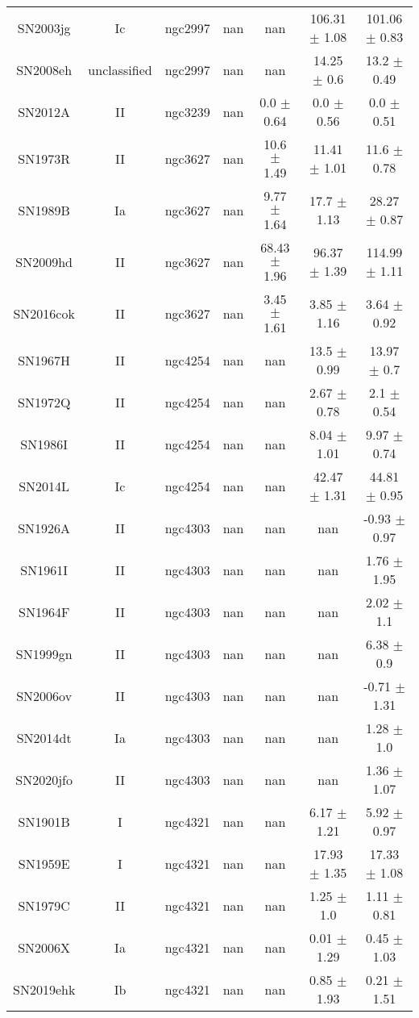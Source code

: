 \begin{table}
\begin{tabular}{ccccccc}
SN2003jg & Ic & ngc2997 & nan & nan & 106.31 $\pm$ 1.08 & 101.06 $\pm$ 0.83 \\
SN2008eh & unclassified & ngc2997 & nan & nan & 14.25 $\pm$ 0.6 & 13.2 $\pm$ 0.49 \\
SN2012A & II & ngc3239 & nan & 0.0 $\pm$ 0.64 & 0.0 $\pm$ 0.56 & 0.0 $\pm$ 0.51 \\
SN1973R & II & ngc3627 & nan & 10.6 $\pm$ 1.49 & 11.41 $\pm$ 1.01 & 11.6 $\pm$ 0.78 \\
SN1989B & Ia & ngc3627 & nan & 9.77 $\pm$ 1.64 & 17.7 $\pm$ 1.13 & 28.27 $\pm$ 0.87 \\
SN2009hd & II & ngc3627 & nan & 68.43 $\pm$ 1.96 & 96.37 $\pm$ 1.39 & 114.99 $\pm$ 1.11 \\
SN2016cok & II & ngc3627 & nan & 3.45 $\pm$ 1.61 & 3.85 $\pm$ 1.16 & 3.64 $\pm$ 0.92 \\
SN1967H & II & ngc4254 & nan & nan & 13.5 $\pm$ 0.99 & 13.97 $\pm$ 0.7 \\
SN1972Q & II & ngc4254 & nan & nan & 2.67 $\pm$ 0.78 & 2.1 $\pm$ 0.54 \\
SN1986I & II & ngc4254 & nan & nan & 8.04 $\pm$ 1.01 & 9.97 $\pm$ 0.74 \\
SN2014L & Ic & ngc4254 & nan & nan & 42.47 $\pm$ 1.31 & 44.81 $\pm$ 0.95 \\
SN1926A & II & ngc4303 & nan & nan & nan & -0.93 $\pm$ 0.97 \\
SN1961I & II & ngc4303 & nan & nan & nan & 1.76 $\pm$ 1.95 \\
SN1964F & II & ngc4303 & nan & nan & nan & 2.02 $\pm$ 1.1 \\
SN1999gn & II & ngc4303 & nan & nan & nan & 6.38 $\pm$ 0.9 \\
SN2006ov & II & ngc4303 & nan & nan & nan & -0.71 $\pm$ 1.31 \\
SN2014dt & Ia & ngc4303 & nan & nan & nan & 1.28 $\pm$ 1.0 \\
SN2020jfo & II & ngc4303 & nan & nan & nan & 1.36 $\pm$ 1.07 \\
SN1901B & I & ngc4321 & nan & nan & 6.17 $\pm$ 1.21 & 5.92 $\pm$ 0.97 \\
SN1959E & I & ngc4321 & nan & nan & 17.93 $\pm$ 1.35 & 17.33 $\pm$ 1.08 \\
SN1979C & II & ngc4321 & nan & nan & 1.25 $\pm$ 1.0 & 1.11 $\pm$ 0.81 \\
SN2006X & Ia & ngc4321 & nan & nan & 0.01 $\pm$ 1.29 & 0.45 $\pm$ 1.03 \\
SN2019ehk & Ib & ngc4321 & nan & nan & 0.85 $\pm$ 1.93 & 0.21 $\pm$ 1.51 \\

\end{tabular}
\end{table}
